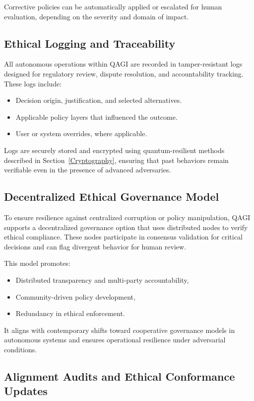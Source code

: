 \documentclass{article}
\theoremstyle{plain}
\theoremstyle{claimstyle}
\begin{document}
Corrective policies can be automatically applied or escalated for human evaluation, depending on the severity and domain of impact.

\subsection{Ethical Logging and Traceability}

All autonomous operations within QAGI are recorded in tamper-resistant logs designed for regulatory review, dispute resolution, and accountability tracking. These logs include:
\begin{itemize}
    \item Decision origin, justification, and selected alternatives.
    \item Applicable policy layers that influenced the outcome.
    \item User or system overrides, where applicable.
\end{itemize}

Logs are securely stored and encrypted using quantum-resilient methods described in Section~\ref{Cryptography}, ensuring that past behaviors remain verifiable even in the presence of advanced adversaries.

\subsection{Decentralized Ethical Governance Model}

To ensure resilience against centralized corruption or policy manipulation, QAGI supports a decentralized governance option that uses distributed nodes to verify ethical compliance. These nodes participate in consensus validation for critical decisions and can flag divergent behavior for human review.

This model promotes:
\begin{itemize}
    \item Distributed transparency and multi-party accountability,
    \item Community-driven policy development,
    \item Redundancy in ethical enforcement.
\end{itemize}

It aligns with contemporary shifts toward cooperative governance models in autonomous systems and ensures operational resilience under adversarial conditions.

\subsection{Alignment Audits and Ethical Conformance Updates}
\end{document}
